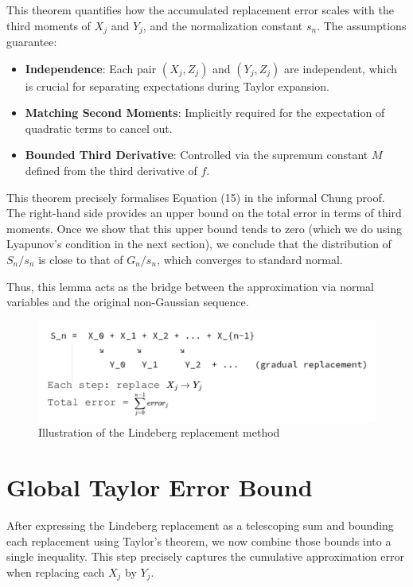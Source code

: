This theorem quantifies how the accumulated replacement error scales with the third moments of $X_j$ and $Y_j$, and the normalization constant $s_n$. The assumptions guarantee:

\begin{itemize}
\item \textbf{Independence}: Each pair $(X_j, Z_j)$ and $(Y_j, Z_j)$ are independent, which is crucial for separating expectations during Taylor expansion.
\item \textbf{Matching Second Moments}: Implicitly required for the expectation of quadratic terms to cancel out.
\item \textbf{Bounded Third Derivative}: Controlled via the supremum constant $M$ defined from the third derivative of $f$.
\end{itemize}

This theorem precisely formalises Equation (15) in the informal Chung proof. The right-hand side provides an upper bound on the total error in terms of third moments. Once we show that this upper bound tends to zero (which we do using Lyapunov’s condition in the next section), we conclude that the distribution of $S_n / s_n$ is close to that of $G_n / s_n$, which converges to standard normal.

Thus, this lemma acts as the bridge between the approximation via normal variables and the original non-Gaussian sequence.

\begin{figure}[h]
  \caption{Illustration of the Lindeberg replacement method}
  \includegraphics[width=12cm]{./img/replacement.png}
  \centering
\end{figure}


\section{Global Taylor Error Bound}

After expressing the Lindeberg replacement as a telescoping sum and bounding each replacement using Taylor’s theorem, we now combine those bounds into a single inequality. This step precisely captures the cumulative approximation error when replacing each $X_j$ by $Y_j$.


